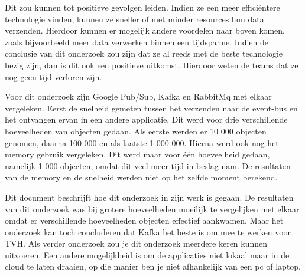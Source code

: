 Dit zou kunnen tot positieve gevolgen leiden. Indien ze een meer efficiëntere technologie vinden, kunnen ze sneller of met minder resources hun data verzenden. Hierdoor kunnen er mogelijk andere voordelen naar boven komen, zoals bijvoorbeeld meer data verwerken binnen een tijdspanne. Indien de conclusie van dit onderzoek zou zijn dat ze al reeds met de beste technologie bezig zijn, dan is dit ook een positieve uitkomst. Hierdoor weten de teams dat ze nog geen tijd verloren zijn.

Voor dit onderzoek zijn Google Pub/Sub, Kafka en RabbitMq met elkaar vergeleken. Eerst de snelheid gemeten tussen het verzenden naar de event-bus en het ontvangen ervan in een andere applicatie. Dit werd voor drie verschillende hoeveelheden van objecten gedaan. Als eerste werden er 10 000 objecten genomen, daarna 100 000 en als laatste 1 000 000. Hierna werd ook nog het memory gebruik vergeleken. Dit werd maar voor één hoeveelheid gedaan, namelijk 1 000 objecten, omdat dit veel meer tijd in beslag nam. De resultaten van de memory en de snelheid werden niet op het zelfde moment berekend. 

Dit document beschrijft hoe dit onderzoek in zijn werk is gegaan. De resultaten van dit onderzoek was bij grotere hoeveelheden moeilijk te vergelijken met elkaar omdat er verschillende hoeveelheden objecten effectief aankwamen. Maar het onderzoek kan toch concluderen dat Kafka het beste is om mee te werken voor TVH. Als verder onderzoek zou je dit onderzoek meerdere keren kunnen uitvoeren. Een andere mogelijkheid is om de applicaties niet lokaal maar in de cloud te laten draaien, op die manier ben je niet afhankelijk van een pc of laptop.
